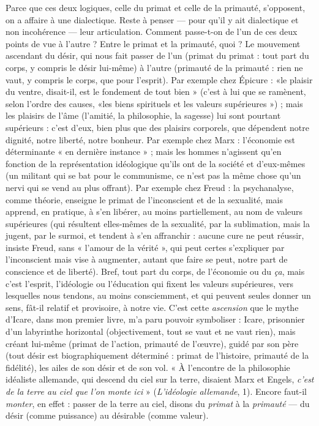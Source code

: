 Parce que ces deux logiques, celle du primat et celle de la primauté, s’opposent,
on a affaire à une dialectique. Reste à penser — pour qu’il y ait dialectique
et non incohérence — leur articulation. Comment passe-t-on de l’un de ces
deux points de vue à l’autre ? Entre le primat et la primauté, quoi ? Le mouvement
ascendant du désir, qui nous fait passer de l’un (primat du primat : tout
part du corps, y compris le désir lui-même) à l’autre (primauté de la primauté :
rien ne vaut, y compris le corps, que pour l'esprit). Par exemple chez Épicure :
«le plaisir du ventre, disait-il, est le fondement de tout bien » (c’est à lui que se
ramènent, selon l’ordre des causes, «les biens spirituels et les valeurs
supérieures ») ; mais les plaisirs de l'âme (l'amitié, la philosophie, la sagesse) lui
sont pourtant supérieurs : c’est d’eux, bien plus que des plaisirs corporels, que
dépendent notre dignité, notre liberté, notre bonheur. Par exemple chez Marx :
l’économie est déterminante « en dernière instance » ; mais les hommes n’agissent
qu’en fonction de la représentation idéologique qu’ils ont de la société et
d'eux-mêmes (un militant qui se bat pour le communisme, ce n’est pas la
même chose qu’un nervi qui se vend au plus offrant). Par exemple chez Freud :
la psychanalyse, comme théorie, enseigne le primat de l'inconscient et de la
sexualité, mais apprend, en pratique, à s’en libérer, au moins partiellement, au
nom de valeurs supérieures (qui résultent elles-mêmes de la sexualité, par la
sublimation, mais la jugent, par le surmoi, et tendent à s’en affranchir : aucune
cure ne peut réussir, insiste Freud, sans « l’amour de la vérité », qui peut certes
s'expliquer par l'inconscient mais vise à augmenter, autant que faire se peut,
notre part de conscience et de liberté). Bref, tout part du corps, de l’économie
ou du {\it ça}, mais c’est l'esprit, l'idéologie ou l'éducation qui fixent les valeurs
supérieures, vers lesquelles nous tendons, au moins consciemment, et qui peuvent
seules donner un sens, fât-il relatif et provisoire, à notre vie. C’est cette
{\it ascension} que le mythe d’Icare, dans mon premier livre, m’a paru pouvoir
symboliser : Icare, prisonnier d’un labyrinthe horizontal (objectivement, tout
se vaut et ne vaut rien), mais créant lui-même (primat de l’action, primauté de
l'œuvre), guidé par son père (tout désir est biographiquement déterminé :
primat de l’histoire, primauté de la fidélité), les ailes de son désir et de son vol.
« À l'encontre de la philosophie idéaliste allemande, qui descend du ciel sur la
terre, disaient Marx et Engels, {\it c'est de la terre au ciel que l'on monte ici} » ({\it L'idéologie
allemande}, 1). Encore faut-il {\it monter}, en effet : passer de la terre au ciel,
disons du {\it primat} à la {\it primauté} — du désir (comme puissance) au désirable
(comme valeur).

